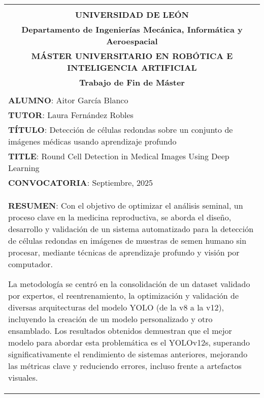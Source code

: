 \begin{center}
\end{center}

\setlength{\LTleft}{-1.25cm}      %
\setlength{\LTright}{0pt}      %

\begin{longtable}{|l|l|}
	\cline{1-2}
	\multicolumn{2}{|c|}{}	\\
	\multicolumn{2}{|c|}{\textbf{UNIVERSIDAD DE LEÓN}}	\\
	\multicolumn{2}{|c|}{\textbf{Departamento de Ingenierías Mecánica, Informática y Aeroespacial}}	\\ 
	\multicolumn{2}{|c|}{\textbf{MÁSTER UNIVERSITARIO EN ROBÓTICA E INTELIGENCIA ARTIFICIAL}}	\\
	\multicolumn{2}{|c|}{\textbf{Trabajo de Fin de Máster}}	\\ 
	\multicolumn{2}{|c|}{}	\\ \hline
	\multicolumn{2}{|l|}{\textbf{ALUMNO}: Aitor García Blanco}	\\ \hline
	\multicolumn{2}{|l|}{\textbf{TUTOR}: Laura Fernández Robles}	\\ \hline
	\multicolumn{2}{|p{17cm}|}{\textbf{TÍTULO}: Detección de células redondas sobre un conjunto de imágenes médicas usando aprendizaje profundo} \\ \hline
	\multicolumn{2}{|p{17cm}|}{\textbf{TITLE}: Round Cell Detection in Medical Images Using Deep Learning} \\ \hline
	\multicolumn{2}{|l|}{\textbf{CONVOCATORIA}: Septiembre, 2025}		\\ \hline
	\multicolumn{2}{|p{17cm}|}{\textbf{RESUMEN}: Con el objetivo de optimizar el análisis seminal, un proceso clave en la medicina reproductiva, 
	se aborda el diseño, desarrollo y validación de un sistema automatizado para la detección de células redondas en imágenes de muestras de semen 
	humano sin procesar, mediante técnicas de aprendizaje profundo y visión por computador.
	
	La metodología se centró en la consolidación de un dataset validado por expertos, el reentrenamiento, la optimización y validación de diversas arquitecturas del modelo YOLO (de la v8 a la v12),
	incluyendo la creación de un modelo personalizado y otro ensamblado. Los resultados obtenidos demuestran que el mejor modelo para abordar esta problemática es el YOLOv12s, 
	superando significativamente el rendimiento de sistemas anteriores, mejorando las métricas clave y reduciendo errores, incluso frente a artefactos visuales.
	
}
\end{longtable}
